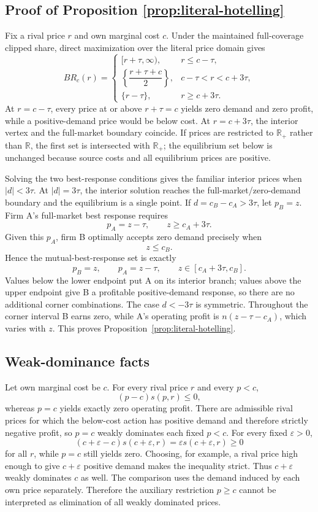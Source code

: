 \subsection{Proof of Proposition \ref{prop:literal-hotelling}}

Fix a rival price \(r\) and own marginal cost \(c\).  Under the maintained
full-coverage clipped share, direct maximization over the literal price domain
gives
\[
BR_c(r)=
\begin{cases}
[r+\tau,\infty),
& r\le c-\tau,\\[3pt]
\left\{\dfrac{r+\tau+c}{2}\right\},
& c-\tau<r<c+3\tau,\\[8pt]
\{r-\tau\},
& r\ge c+3\tau.
\end{cases}
\]
At \(r=c-\tau\), every price at or above \(r+\tau=c\) yields zero
demand and zero profit, while a positive-demand price would be below cost.  At
\(r=c+3\tau\), the interior vertex and the full-market boundary coincide.
If prices are restricted to \(\mathbb R_+\) rather than \(\mathbb R\),
the first set is intersected with \(\mathbb R_+\); the equilibrium set below
is unchanged because source costs and all equilibrium prices are positive.

Solving the two best-response conditions gives the familiar interior prices
when \(|d|<3\tau\).  At \(|d|=3\tau\), the interior solution reaches the
full-market/zero-demand boundary and the equilibrium is a single point.  If
\(d=c_B-c_A>3\tau\), let \(p_B=z\).  Firm A's full-market best response
requires
\[
p_A=z-\tau,
\qquad
z\ge c_A+3\tau.
\]
Given this \(p_A\), firm B optimally accepts zero demand precisely when
\[
z\le c_B.
\]
Hence the mutual-best-response set is exactly
\[
p_B=z,\qquad p_A=z-\tau,
\qquad
z\in[c_A+3\tau,c_B].
\]
Values below the lower endpoint put A on its interior branch; values above the
upper endpoint give B a profitable positive-demand response, so there are no
additional corner combinations.  The case \(d<-3\tau\) is symmetric.
Throughout the corner interval B earns zero, while A's operating profit is
\(n(z-\tau-c_A)\), which varies with \(z\).  This proves
Proposition~\ref{prop:literal-hotelling}.

\subsection{Weak-dominance facts}

Let own marginal cost be \(c\).  For every rival price \(r\) and every
\(p<c\),
\[
(p-c)s(p,r)\le0,
\]
whereas \(p=c\) yields exactly zero operating profit.  There are admissible
rival prices for which the below-cost action has positive demand and therefore
strictly negative profit, so \(p=c\) weakly dominates each fixed \(p<c\).
For every fixed \(\varepsilon>0\),
\[
(c+\varepsilon-c)s(c+\varepsilon,r)
=
\varepsilon s(c+\varepsilon,r)\ge0
\]
for all \(r\), while \(p=c\) still yields zero.  Choosing, for example, a
rival price high enough to give \(c+\varepsilon\) positive demand makes the
inequality strict.  Thus \(c+\varepsilon\) weakly dominates \(c\) as
well.  The comparison uses the demand induced by each own price separately.
Therefore the auxiliary restriction \(p\ge c\) cannot be interpreted as
elimination of all weakly dominated prices.

